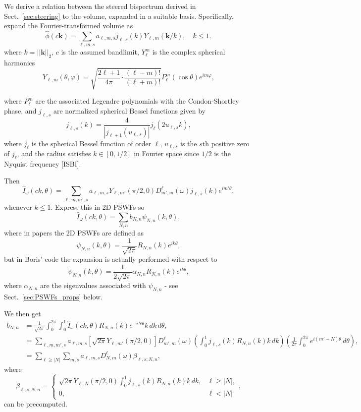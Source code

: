 \documentclass[english,11pt]{article}
\newcommand{\1}{\mathbf{1}}
\newcommand{\kk}{\textbf{k}}
\newcommand{\TODO}[1]{{\color{red}{[#1]}}}
\numberwithin{equation}{section}
\theoremstyle{plain}
\theoremstyle{definition}
\theoremstyle{remark}
\theoremstyle{plain}
\theoremstyle{remark}
\theoremstyle{plain}
\theoremstyle{plain}
\begin{document}
We derive a relation between the steered bispectrum derived in Sect.~\ref{sec:steering} to the volume, expanded in a suitable basis. Specifically, expand the Fourier-transformed volume as
\[ \widehat \phi(c\kk) = \sum_{\ell,m,s}a_{\ell,m,s}j_{\ell,s}(k)Y_{\ell,m}(\kk/k),\quad k\leq 1,\]
where $k=||\kk||_2$, $c$ is the assumed bandlimit, $Y_{\ell}^m$ is the complex spherical harmonics
\[ Y_{\ell,m}(\theta,\varphi) = \sqrt{\frac{2\ell+1}{4\pi}\cdot\frac{(\ell-m)!}{(\ell+m)!}}P_{\ell}^m(\cos\theta)e^{i m\varphi},\]

where $P_{\ell}^m$ are the associated Legendre polynomials with the Condon-Shortley phase, and $j_{\ell,s}$ are normalized spherical Bessel functions given by
\[ j_{\ell, s}(k) = \frac{4}{|j_{\ell+1}(u_{\ell, s})|}j_{\ell}(2u_{\ell,s} k),\]
where $j_{\ell}$ is the spherical Bessel function of order $\ell$, $u_{\ell,s}$ is the $s$th positive zero of $j_{\ell}$, and the radius satisfies $k\in[0,1/2]$ in Fourier space since $1/2$ is the Nyquist frequency [ISBI].

Then
\[ \widehat I_{\omega}(ck,\theta) = \sum_{\ell,m,m',s}a_{\ell,m,s}Y_{\ell,m'}(\pi/2,0)D_{m',m}^{\ell}(\omega)j_{\ell,s}(k)e^{im'\theta},\]
whenever $k\leq 1$. Express this in 2D PSWFs so \TODO{Eitan: I stopped here}
\[ \widehat I_{\omega}(ck,\theta) = \sum_{N,n}b_{N,n}\psi_{N,n}(k,\theta),\]
where in papers the 2D PSWFs are defined as
\[ \psi_{N,n}(k,\theta) = \frac{1}{\sqrt{2\pi}}R_{N,n}(k)e^{ik\theta},\]
but in Boris' code the expansion is actually performed with respect to
\[ \widetilde\psi_{N,n}(k,\theta) = \frac{1}{2\sqrt{2\pi}}\alpha_{N,n}R_{N,n}(k)e^{ik\theta},\]
where $\alpha_{N,n}$ are the eigenvalues associated with $\psi_{N,n}$ - see Sect.~\ref{sec:PSWFs_props} below. 

We then get
\[\begin{aligned} b_{N,n} &= \frac{1}{\sqrt{2\pi}}\int_0^{2\pi}\int_0^1\widehat I_{\omega}(ck,\theta)R_{N,n}(k)e^{-iN\theta}k\, dk\, d\theta,\\
&= \sum_{\ell,m,m',s}a_{\ell,m,s}[\sqrt{2\pi}Y_{\ell,m'}(\pi/2,0)]D_{m',m}^{\ell}(\omega)\left(\int_0^1j_{\ell,s}(k)R_{N,n}(k)k\, dk\right)\left(\frac{1}{2\pi}\int_0^{2\pi}e^{i(m'-N)\theta}\, d\theta\right),\\
&= \sum_{\ell\geq |N|}\sum_{m,s}a_{\ell,m,s}D_{N,m}^{\ell}(\omega)\beta_{\ell,s;N,n},\end{aligned}\]
where
\[ \beta_{\ell,s;N,n} = \left\{\begin{array}{ll} \sqrt{2\pi}Y_{\ell,N}(\pi/2,0)\int_0^1j_{\ell,s}(k)R_{N,n}(k)k\, dk, & \ell\geq |N|,\\ 0, & \ell<|N|\end{array}\right.,\]
can be precomputed.
\end{document}
